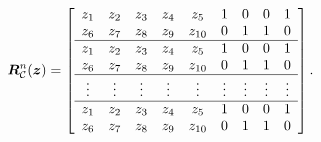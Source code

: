 \documentclass[letterpaper,10pt,conference]{ieeeconf}  %
\begin{document}
\begin{equation}
\bm{R}_\mathcal{C}^n(\bm{z})
=
\left[
\begin{array}{ccccc cccc}
z_1&z_2&z_3&z_4&z_5&1&0&0&1 \\
z_6&z_7&z_8&z_9&z_{10}&0&1&1&0 \\ 
\hline
z_1&z_2&z_3&z_4&z_5&1&0&0&1 \\
z_6&z_7&z_8&z_9&z_{10}&0&1&1&0 \\ 
\hline
\vdots&\vdots&\vdots&\vdots&\vdots&\vdots&\vdots&\vdots&\vdots \\
\hline
z_1&z_2&z_3&z_4&z_5&1&0&0&1 \\
z_6&z_7&z_8&z_9&z_{10}&0&1&1&0 \\ 
\end{array}
\right] .
\label{eq:gait_ptrn_curve}
\end{equation}
\end{document}
